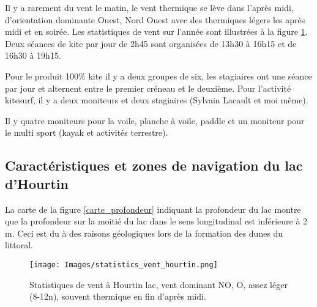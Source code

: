 \documentclass[11pt,a4paper]{report}
\begin{document}
Il y a rarement du vent le matin, le vent thermique se lève dans
l'après midi, d'orientation dominante Ouest, Nord Ouest avec des
thermiques légers les après midi et  en soirée. Les statistiques
de vent sur l'année sont illustrées à la figure \ref{vent_stats}.
Deux séances de kite par jour de 2h45 sont organisées de
13h30 à 16h15 et de 16h30 à 19h15. 

Pour le produit 100\;\% kite il y a deux groupes de six, les stagiaires ont
une séance par jour et alternent entre le premier créneau et le deuxième.
Pour l'activité kitesurf, il y a deux moniteurs et deux stagiaires
(Sylvain Lacault et moi m\^eme).

Il y quatre moniteurs pour la voile, planche à voile, paddle et un moniteur 
pour le multi sport (kayak et activités terrestre).

\subsection{Caractéristiques  et zones de navigation du lac d'Hourtin}

La carte de la figure \ref{carte_profondeur} indiquant la 
profondeur du lac montre que la profondeur sur la moitié du lac
dans le sens longitudinal est inférieure à 2 m. 
Ceci est du à des raisons géologiques lors de la
formation des dunes du littoral.
\begin{figure}
\centering
\texttt{[image: Images/statistics\_vent\_hourtin.png]} 
\caption{Statistiques de vent à Hourtin lac, vent dominant NO, O, assez léger (8-12n), 
souvent thermique en fin d'après midi.\label{vent_stats}}
\end{figure}

\end{document}
